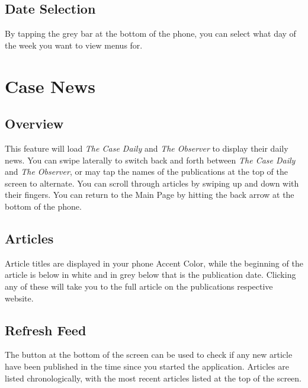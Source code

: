 \documentclass[pdftex,12pt,letter]{article}
\begin{document}
\subsection{Date Selection}
By tapping the grey bar at the bottom of the phone, you can select what day of the week you want to view menus for.

\section{Case News}
\subsection{Overview}
This feature will load  \emph{The Case Daily} and \emph{The Observer} to display their daily news. You can swipe laterally to switch back and forth between  \emph{The Case Daily} and \emph{The Observer}, or may tap the names of the publications at the top of the screen to alternate. You can scroll through articles by swiping up and down with their fingers. You can return to the Main Page by hitting the back arrow at the bottom of the phone. 
\subsection{Articles}
Article titles are displayed in your phone Accent Color, while the beginning of the article is below in white and in grey below that is the publication date. Clicking any of these will take you to the full article on the publications respective website.
\subsection{Refresh Feed}
The button at the bottom of the screen can be used to check if any new article have been published in the time since you started the application. Articles are listed chronologically, with the most recent articles listed at the top of the screen.
\end{document}

